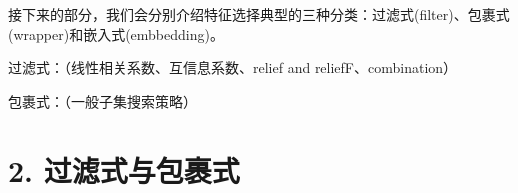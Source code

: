 \documentclass[a4paper,UTF8]{article}
\begin{document}
  接下来的部分，我们会分别介绍特征选择典型的三种分类：过滤式(filter)、包裹式(wrapper)和嵌入式(embbedding)。

  过滤式：（线性相关系数、互信息系数、relief and reliefF、combination）

  包裹式：（一般子集搜索策略）





\section*{2. 过滤式与包裹式}
\end{document}
